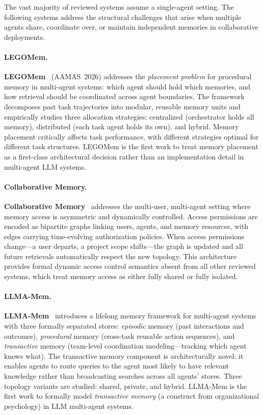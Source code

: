 The vast majority of reviewed systems assume a single-agent setting.
The following systems address the structural challenges that arise when
multiple agents share, coordinate over, or maintain independent memories
in collaborative deployments.

\paragraph{LEGOMem.}
\textbf{LEGOMem}~\cite{legomem2025} (AAMAS~2026) addresses the
\emph{placement problem} for procedural memory in multi-agent systems:
which agent should hold which memories, and how retrieval should be
coordinated across agent boundaries.  The framework decomposes past
task trajectories into modular, reusable memory units and empirically
studies three allocation strategies: centralized (orchestrator holds
all memory), distributed (each task agent holds its own), and hybrid.
Memory placement critically affects task performance, with different
strategies optimal for different task structures.  LEGOMem is the
first work to treat memory placement as a first-class architectural
decision rather than an implementation detail in multi-agent LLM
systems.

\paragraph{Collaborative Memory.}
\textbf{Collaborative Memory}~\cite{collaborativemem2025} addresses
the multi-user, multi-agent setting where memory access is asymmetric
and dynamically controlled.  Access permissions are encoded as bipartite
graphs linking users, agents, and memory resources, with edges carrying
time-evolving authorization policies.  When access permissions
change---a user departs, a project scope shifts---the graph is updated
and all future retrievals automatically respect the new topology.  This
architecture provides formal dynamic access control semantics absent
from all other reviewed systems, which treat memory access as either
fully shared or fully isolated.

\paragraph{LLMA-Mem.}
\textbf{LLMA-Mem}~\cite{llmamem2026} introduces a lifelong memory
framework for multi-agent systems with three formally separated stores:
\emph{episodic} memory (past interactions and outcomes),
\emph{procedural} memory (cross-task reusable action sequences), and
\emph{transactive} memory (team-level coordination modeling---tracking
which agent knows what).  The transactive memory component is
architecturally novel: it enables agents to route queries to the agent
most likely to have relevant knowledge rather than broadcasting searches
across all agents' stores.  Three topology variants are studied:
shared, private, and hybrid.  LLMA-Mem is the first work to formally
model \emph{transactive memory} (a construct from organizational
psychology) in LLM multi-agent systems.

